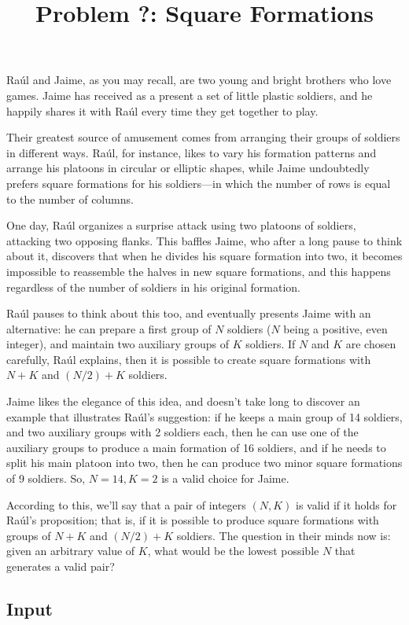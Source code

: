 \documentclass[12pt]{article}
\title{ Problem ?: Square Formations }
\begin{document}
\maketitle

Raúl and Jaime, as you may recall, are two young and bright brothers who
love games. Jaime has received as a present a set of little plastic
soldiers, and he happily shares it with Raúl every time they get
together to play.

Their greatest source of amusement comes from arranging their groups of
soldiers in different ways. Raúl, for instance, likes to vary his
formation patterns and arrange his platoons in circular or elliptic
shapes, while Jaime undoubtedly prefers square formations for his
soldiers---in which the number of rows is equal to the number of
columns.

One day, Raúl organizes a surprise attack using two platoons of
soldiers, attacking two opposing flanks. This baffles Jaime, who after a
long pause to think about it, discovers that when he divides his square
formation into two, it becomes impossible to reassemble the halves in
new square formations, and this happens regardless of the number of
soldiers in his original formation.

Raúl pauses to think about this too, and eventually presents Jaime with
an alternative: he can prepare a first group of $N$ soldiers ($N$ being
a positive, even integer), and maintain two auxiliary groups of $K$
soldiers. If $N$ and $K$ are chosen carefully, Raúl explains, then it is
possible to create square formations with $N+K$ and $(N/2)+K$ soldiers.

Jaime likes the elegance of this idea, and doesn't take long to discover
an example that illustrates Raúl's suggestion: if he keeps a main group
of 14 soldiers, and two auxiliary groups with 2 soldiers each, then he
can use one of the auxiliary groups to produce a main formation of 16
soldiers, and if he needs to split his main platoon into two, then he
can produce two minor square formations of 9 soldiers. So, $N=14, K=2$
is a valid choice for Jaime.

According to this, we'll say that a pair of integers $(N, K)$ is valid
if it holds for Raúl's proposition; that is, if it is possible to
produce square formations with groups of $N+K$ and $(N/2)+K$ soldiers.
The question in their minds now is: given an arbitrary value of $K$,
what would be the lowest possible $N$ that generates a valid pair?

\subsection{Input}\label{input}
\end{document}

